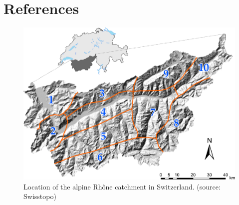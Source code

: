 \documentclass[5p]{elsarticle}
\begin{document}
\section*{References}







\begin{figure}[htb]
	\centerline{\includegraphics[width=\linewidth]{figures/figure_map.pdf}}
	\caption{Location of the alpine Rh\^{o}ne catchment in Switzerland. (source: Swisstopo)}
	\label{fig:map}
\end{figure}
\end{document}
